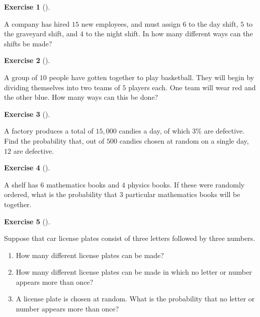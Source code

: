 \documentclass[
  letterpaper,
  DIV=11,
  numbers=noendperiod]{scrreprt}
\providecommand{\tightlist}{%
  \setlength{\itemsep}{0pt}\setlength{\parskip}{0pt}}\usepackage{longtable,booktabs,array}
\theoremstyle{definition}
\theoremstyle{definition}
\newtheorem{exercise}{Exercise}[chapter]
\theoremstyle{definition}
\theoremstyle{remark}
\begin{document}
\begin{exercise}[]\protect\hypertarget{exr-3.15}{}\label{exr-3.15}

A company has hired \(15\) new employees, and must assign \(6\) to the
day shift, \(5\) to the graveyard shift, and \(4\) to the night shift.
In how many different ways can the shifts be made?

\end{exercise}

\begin{exercise}[]\protect\hypertarget{exr-3.16}{}\label{exr-3.16}

A group of \(10\) people have gotten together to play basketball. They
will begin by dividing themselves into two teams of \(5\) players each.
One team will wear red and the other blue. How many ways can this be
done?

\end{exercise}

\begin{exercise}[]\protect\hypertarget{exr-3.17}{}\label{exr-3.17}

A factory produces a total of \(15,000\) candies a day, of which \(3\%\)
are defective. Find the probability that, out of \(500\) candies chosen
at random on a single day, \(12\) are defective.

\end{exercise}

\begin{exercise}[]\protect\hypertarget{exr-3.18}{}\label{exr-3.18}

A shelf has \(6\) mathematics books and \(4\) physics books. If these
were randomly ordered, what is the probability that \(3\) particular
mathematics books will be together.

\end{exercise}

\begin{exercise}[]\protect\hypertarget{exr-3.19}{}\label{exr-3.19}

Suppose that car license plates consist of three letters followed by
three numbers.

\begin{enumerate}
\def\labelenumi{\alph{enumi}.}
\tightlist
\item
  How many different license plates can be made?
\item
  How many different license plates can be made in which no letter or
  number appears more than once?
\item
  A license plate is chosen at random. What is the probability that no
  letter or number appears more than once?
\end{enumerate}

\end{exercise}
\end{document}
